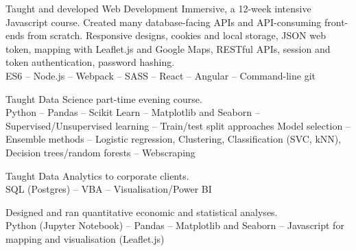 \documentclass[a4paper,nomath]{deedy-resume} %
\begin{document}
\begin{paracol}{2}
\begin{tightitemize}
	\end{tightitemize}
	
	\sectionspace %
	

    \vspace{\topsep} %
    \begin{tightitemize}
    	\item Taught and developed Web Development Immersive, a 12-week intensive Javascript course.
    	Created many database-facing APIs and API-consuming front-ends from scratch.
    	Responsive designs, cookies and local storage, JSON web token, mapping with Leaflet.js and Google Maps,
    	RESTful APIs, session and token authentication, password hashing.
    	\\
    	ES6 -- Node.js -- Webpack -- SASS -- React -- Angular -- Command-line git
    	\\
    	\item Taught Data Science part-time evening course.\\
    	Python -- Pandas -- Scikit Learn -- Matplotlib and Seaborn -- Supervised/Unsupervised learning -- Train/test split approaches \textbullet {} Model selection -- Ensemble methods -- Logistic regression, Clustering, Classification (SVC, kNN), Decision trees/random forests -- Webscraping \\
    	\item Taught Data Analytics to corporate clients.\\
    	SQL (Postgres) -- VBA -- Visualisation/Power BI
    	
    \end{tightitemize}
    
    \sectionspace %


    \vspace{\topsep} %
    \begin{tightitemize}
    	\item Designed and ran quantitative economic and statistical analyses.\\
    	Python (Jupyter Notebook) -- Pandas -- Matplotlib and Seaborn -- Javascript for mapping and visualisation (Leaflet.js)
    	

\end{tightitemize}
\end{paracol}
\end{document}
